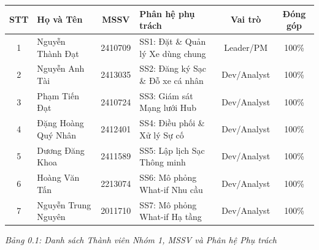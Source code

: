 \documentclass[12pt,a4paper]{report}
\begin{document}

    \vspace*{\fill}
    \begin{center}
        \renewcommand{\arraystretch}{1.5}
        \begin{tabularx}{\textwidth}{|c|X|c|X|c|c|}
            \hline
            \textbf{STT} & \textbf{Họ và Tên} & \textbf{MSSV} & \textbf{Phân hệ phụ trách} & \textbf{Vai trò} & \textbf{Đóng góp} \\
            \hline
            1 & Nguyễn Thành Đạt & 2410709 & SS1: Đặt \& Quản lý Xe dùng chung & Leader/PM & 100\% \\
            \hline
            2 & Nguyễn Anh Tài & 2413035 & SS2: Đăng ký Sạc \& Đỗ xe cá nhân & Dev/Analyst & 100\% \\
            \hline
            3 & Phạm Tiến Đạt & 2410724 & SS3: Giám sát Mạng lưới Hub & Dev/Analyst & 100\% \\
            \hline
            4 & Đặng Hoàng Quý Nhân & 2412401 & SS4: Điều phối \& Xử lý Sự cố & Dev/Analyst & 100\% \\
            \hline
            5 & Dương Đăng Khoa & 2411589 & SS5: Lập lịch Sạc Thông minh & Dev/Analyst & 100\% \\
            \hline
            6 & Hoàng Văn Tấn & 2213074 & SS6: Mô phỏng What-if Nhu cầu & Dev/Analyst & 100\% \\
            \hline
            7 & Nguyễn Trung Nguyên & 2011710 & SS7: Mô phỏng What-if Hạ tầng & Dev/Analyst & 100\% \\
            \hline
        \end{tabularx}
\begin{center}
\textit{Bảng 0.1: Danh sách Thành viên Nhóm 1, MSSV và Phân hệ Phụ trách}
\end{center}

\end{center}
    \vspace*{\fill}
\newpage

\tableofcontents

\end{document}
